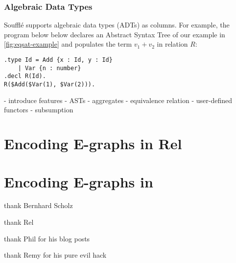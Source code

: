 \subsubsection*{Algebraic Data Types}
Souffl\'e supports algebraic data types (ADTs) as columns.
For example, the program below below declares 
 an Abstract Syntax Tree of our example in \autoref{fig:eqsat-example}
 and populates the term $v_1+v_2$ in relation $R$:
\begin{verbatim}
.type Id = Add {x : Id, y : Id}
    | Var {n : number}
.decl R(Id).
R($Add($Var(1), $Var(2))).
\end{verbatim}


- introduce features
    - ASTs
    - aggregates
    - equivalence relation
    - user-defined functors
    - subsumption




\section{Encoding E-graphs in Rel}

\section{Encoding E-graphs in }

thank Bernhard Scholz

thank Rel

thank Phil for his blog posts

thank Remy for his pure evil hack